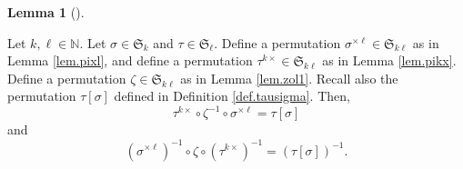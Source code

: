 \documentclass[numbers=enddot,12pt,final,onecolumn,notitlepage]{scrartcl}%
\theoremstyle{definition}
\newtheorem{lem}[theo]{Lemma}
\newenvironment{lemma}[1][]
{\begin{lem}[#1]\begin{leftbar}}
{\end{leftbar}\end{lem}}
\begin{document}
\begin{lemma}
\label{lem.sitaze}Let $k,\ell\in\mathbb{N}$. Let $\sigma\in\mathfrak{S}_{k}$
and $\tau\in\mathfrak{S}_{\ell}$. Define a permutation $\sigma^{\times\ell}%
\in\mathfrak{S}_{k\ell}$ as in Lemma \ref{lem.pixl}, and define a permutation
$\tau^{k\times}\in\mathfrak{S}_{k\ell}$ as in Lemma \ref{lem.pikx}. Define a
permutation $\zeta\in\mathfrak{S}_{k\ell}$ as in Lemma \ref{lem.zol1}. Recall
also the permutation $\tau\left[  \sigma\right]  $ defined in Definition
\ref{def.tausigma}. Then,%
\begin{equation}
\tau^{k\times}\circ\zeta^{-1}\circ\sigma^{\times\ell}=\tau\left[
\sigma\right]  \label{eq.lem.sitaze.eq.1}%
\end{equation}
and%
\begin{equation}
\left(  \sigma^{\times\ell}\right)  ^{-1}\circ\zeta\circ\left(  \tau^{k\times
}\right)  ^{-1}=\left(  \tau\left[  \sigma\right]  \right)  ^{-1}.
\label{eq.lem.sitaze.eq.2}%
\end{equation}

\end{lemma}
\end{document}
